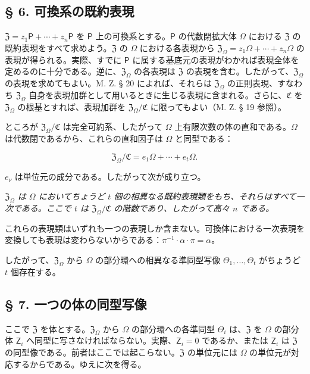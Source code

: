 \subsection*{§ 6. 可換系の既約表現}\label{die-irreduziblen-darstellungen-kommutativer-systeme}

$\mathfrak Z=z_1\mathsf P+\cdots+z_n\mathsf P$ を $\mathsf P$ 上の可換系とする。$\mathsf P$ の代数閉拡大体 $\Omega$ における $\mathfrak Z$ の既約表現をすべて求めよう。$\mathfrak Z$ の $\Omega$ における各表現から $\mathfrak Z_\Omega=z_1\Omega+\cdots+z_n\Omega$ の表現が得られる。実際、すでに $\mathsf P$ に属する基底元の表現がわかれば表現全体を定めるのに十分である。逆に、$\mathfrak Z_\Omega$ の各表現は $\mathfrak Z$ の表現を含む。したがって、$\mathfrak Z_\Omega$ の表現を求めてもよい。M. Z. § 20 によれば、それらは $\mathfrak Z_\Omega$ の正則表現、すなわち $\mathfrak Z_\Omega$ 自身を表現加群として用いるときに生じる表現に含まれる。さらに、$\mathfrak C$ を $\mathfrak Z_\Omega$ の根基とすれば、表現加群を $\mathfrak Z_\Omega/\mathfrak C$ に限ってもよい（M. Z. § 19 参照）。

ところが $\mathfrak Z_\Omega/\mathfrak C$ は完全可約系、したがって $\Omega$ 上有限次数の体の直和である。$\Omega$ は代数閉であるから、これらの直和因子は $\Omega$ と同型である：

\[
\mathfrak Z_\Omega/\mathfrak C=e_1\Omega+\cdots+e_t\Omega.
\]

$e_\nu$ は単位元の成分である。したがって次が成り立つ。

\emph{$\mathfrak Z_\Omega$ は $\Omega$ においてちょうど $t$ 個の相異なる既約表現類をもち、それらはすべて一次である。ここで $t$ は $\mathfrak Z_\Omega/\mathfrak C$ の階数であり、したがって高々 $n$ である。}

これらの表現類はいずれも一つの表現しか含まない。可換体における一次表現を変換しても表現は変わらないからである：$\pi^{-1}\cdot\alpha\cdot\pi=\alpha$。

したがって、$\mathfrak Z_\Omega$ から $\Omega$ の部分環への相異なる準同型写像 $\Theta_1,\ldots,\Theta_t$ がちょうど $t$ 個存在する。

\subsection*{§ 7. 一つの体の同型写像}\label{die-isomorphismen-eines-koerpers}

ここで $\mathfrak Z$ を体とする。$\mathfrak Z_\Omega$ から $\Omega$ の部分環への各準同型 $\Theta_i$ は、$\mathfrak Z$ を $\Omega$ の部分体 $\mathsf{Z}_i$ へ同型に写さなければならない。実際、$\mathsf{Z}_i=0$ であるか、または $\mathsf{Z}_i$ は $\mathfrak Z$ の同型像である。前者はここでは起こらない。$\mathfrak Z$ の単位元には $\Omega$ の単位元が対応するからである。ゆえに次を得る。


